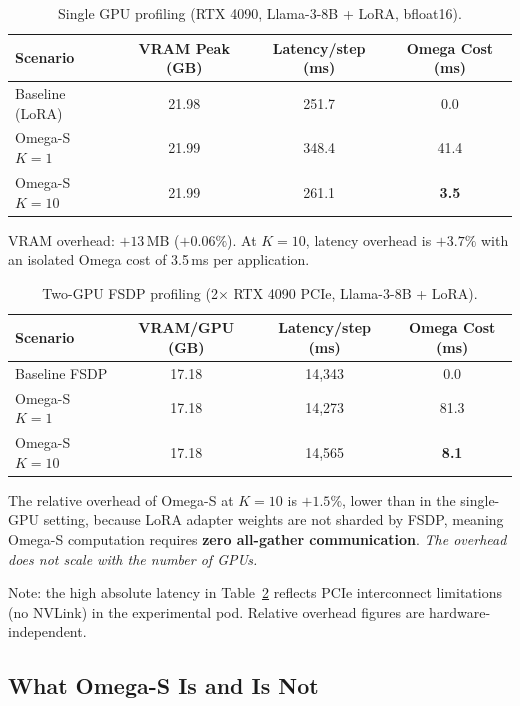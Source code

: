 \documentclass[11pt,a4paper]{article}
\begin{document}
\begin{table}[ht]
\centering
\caption{Single GPU profiling (RTX 4090, Llama-3-8B + LoRA, bfloat16).}
\label{tab:gpu1}
\begin{tabular}{lccc}
\toprule
Scenario & VRAM Peak (GB) & Latency/step (ms) & Omega Cost (ms) \\
\midrule
Baseline (LoRA)  & 21.98 & 251.7 & 0.0 \\
Omega-S $K{=}1$  & 21.99 & 348.4 & 41.4 \\
Omega-S $K{=}10$ & 21.99 & 261.1 & \textbf{3.5} \\
\bottomrule
\end{tabular}
\end{table}

VRAM overhead: $+13$\,MB ($+0.06\%$). At $K{=}10$, latency overhead is
$+3.7\%$ with an isolated Omega cost of 3.5\,ms per application.

\begin{table}[ht]
\centering
\caption{Two-GPU FSDP profiling (2$\times$ RTX 4090 PCIe, Llama-3-8B + LoRA).}
\label{tab:fsdp}
\begin{tabular}{lccc}
\toprule
Scenario & VRAM/GPU (GB) & Latency/step (ms) & Omega Cost (ms) \\
\midrule
Baseline FSDP    & 17.18 & 14,343 & 0.0 \\
Omega-S $K{=}1$  & 17.18 & 14,273 & 81.3 \\
Omega-S $K{=}10$ & 17.18 & 14,565 & \textbf{8.1} \\
\bottomrule
\end{tabular}
\end{table}

The relative overhead of Omega-S at $K{=}10$ is $+1.5\%$, lower than in
the single-GPU setting, because LoRA adapter weights are not sharded by
FSDP, meaning Omega-S computation requires \textbf{zero all-gather
communication}. \emph{The overhead does not scale with the number of GPUs.}

Note: the high absolute latency in Table~\ref{tab:fsdp} reflects PCIe
interconnect limitations (no NVLink) in the experimental pod. Relative
overhead figures are hardware-independent.

\subsection{What Omega-S Is and Is Not}
\end{document}
